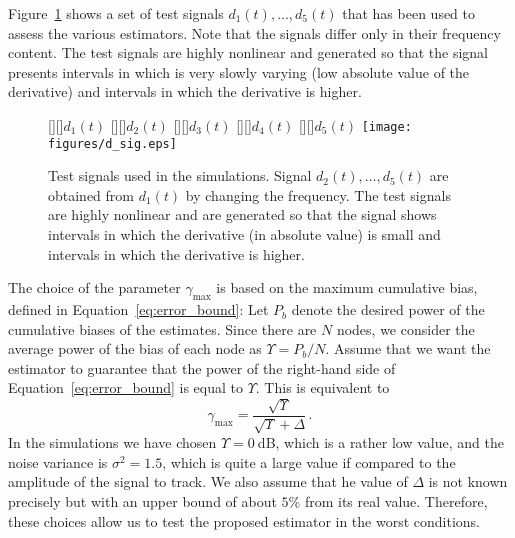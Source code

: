 \documentclass[a4paper,notitlepage,onecolumn]{article}
\numberwithin{equation}{section}
\begin{document}
Figure~\ref{fig:dsig} shows a set of test signals
$d_1(t),\dots,d_5(t)$ that has been used to assess the various
estimators. Note that the signals differ only in their frequency
content. The test signals are highly nonlinear and generated so
that the signal presents intervals in which is very slowly varying
(low absolute value of the derivative) and intervals in which the
derivative is higher.
\begin{figure}
    \centering
    [][]{$d_1(t)$}
    [][]{$d_2(t)$}
    [][]{$d_3(t)$}
    [][]{$d_4(t)$}
    [][]{$d_5(t)$}
    \texttt{[image: figures/d\_sig.eps]}
    \caption{Test signals used in the simulations. Signal $d_2(t),\dots,d_5(t)$ are obtained from $d_1(t)$ by changing the frequency. The test
    signals are highly nonlinear and are generated so that the signal shows intervals in which the derivative (in absolute value) is
    small and intervals in which the derivative is higher.}
    \label{fig:dsig}
\end{figure}
The choice of the parameter $\gamma_{\max}$ is based on the
maximum cumulative bias, defined in
Equation~\eqref{eq:error_bound}: Let $P_b$ denote the desired
power of the cumulative biases of the estimates. Since there are
$N$ nodes, we consider the average power of the bias of each node
as $\Upsilon = P_b/N$. Assume that we want the estimator to
guarantee that the power of the right-hand side of
Equation~\eqref{eq:error_bound} is equal to $\Upsilon$. This is
equivalent to $$
  \gamma_{\max} = \frac{\sqrt{\Upsilon}}{\sqrt{\Upsilon}+\Delta}\,.
$$
In the simulations we have chosen $\Upsilon = 0\:$dB, which is a rather low value, and the noise variance is $\sigma^2 = 1.5$, which is quite a large value if compared to the amplitude of the signal to track. We also assume that he value of $\Delta$ is not known precisely but with an upper bound of about $5$\% from its real value. Therefore, these choices allow us to test the proposed estimator in the worst conditions.
\end{document}
